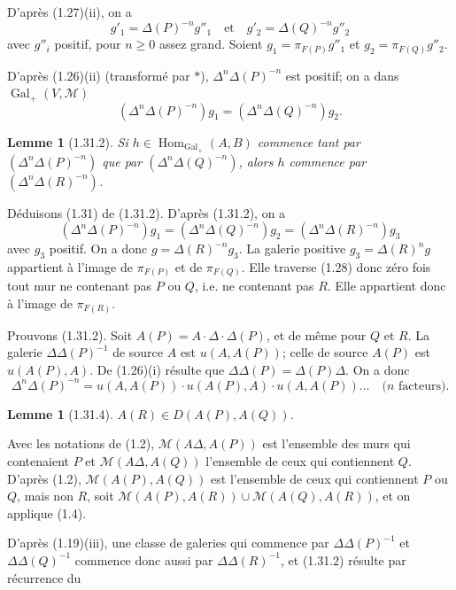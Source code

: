\documentclass[12pt]{article}
\newtheorem{lemme}[theoreme]{Lemme}
\theoremstyle{remark}
\DeclareMathOperator{\Gal}{Gal}
\DeclareMathOperator{\Hom}{Hom}
\begin{document}
D'après (1.27)(ii), on a
\[g'_1 = \Delta(P)^{-n} g''_1 \quad \text{et} \quad g'_2 = \Delta(Q)^{-n} g''_2\]
avec $g''_i$ positif, pour $n \geq 0$ assez grand. Soient $g_1 = \pi_{F(P)} g''_1$ et $g_2 = \pi_{F(Q)} g''_2$.

D'après (1.26)(ii) (transformé par $*$), $\Delta^n \Delta(P)^{-n}$ est positif; on a dans $\Gal_+(V, \mathcal{M})$
\begin{equation}
(\Delta^n \Delta(P)^{-n}) g_1 = (\Delta^n \Delta(Q)^{-n}) g_2.\tag{1.31.1}
\end{equation}

\begin{lemme}[1.31.2]
Si $h \in \Hom_{\Gal_+}(A, B)$ commence tant par $(\Delta^n \Delta(P)^{-n})$ que par $(\Delta^n \Delta(Q)^{-n})$, alors $h$ commence par $(\Delta^n \Delta(R)^{-n})$.
\end{lemme}

Déduisons (1.31) de (1.31.2). D'après (1.31.2), on a
\[(\Delta^n \Delta(P)^{-n}) g_1 = (\Delta^n \Delta(Q)^{-n}) g_2 = (\Delta^n \Delta(R)^{-n}) g_3\]
avec $g_3$ positif. On a donc $g = \Delta(R)^{-n} g_3$. La galerie positive $g_3 = \Delta(R)^n g$ appartient à l'image de $\pi_{F(P)}$ et de $\pi_{F(Q)}$. Elle traverse (1.28) donc zéro fois tout mur ne contenant pas $P$ ou $Q$, i.e. ne contenant pas $R$. Elle appartient donc à l'image de $\pi_{F(R)}$.

Prouvons (1.31.2). Soit $A(P) = A \cdot \Delta \cdot \Delta(P)$, et de même pour $Q$ et $R$. La galerie $\Delta \Delta(P)^{-1}$ de source $A$ est $u(A, A(P))$; celle de source $A(P)$ est $u(A(P), A)$. De (1.26)(i) résulte que $\Delta \Delta(P) = \Delta(P) \Delta$. On a donc
\begin{equation}
\Delta^n \Delta(P)^{-n} = u(A, A(P)) \cdot u(A(P), A) \cdot u(A, A(P)) \ldots \quad \text{($n$ facteurs).}\tag{1.31.3}
\end{equation}

\begin{lemme}[1.31.4]
$A(R) \in D(A(P), A(Q))$.
\end{lemme}

Avec les notations de (1.2), $\mathcal{M}(A \Delta, A(P))$ est l'ensemble des murs qui contenaient $P$ et $\mathcal{M}(A \Delta, A(Q))$ l'ensemble de ceux qui contiennent $Q$. D'après (1.2), $\mathcal{M}(A(P), A(Q))$ est l'ensemble de ceux qui contiennent $P$ ou $Q$, mais non $R$, soit $\mathcal{M}(A(P), A(R)) \cup \mathcal{M}(A(Q), A(R))$, et on applique (1.4).

D'après (1.19)(iii), une classe de galeries qui commence par $\Delta \Delta(P)^{-1}$ et $\Delta \Delta(Q)^{-1}$ commence donc aussi par $\Delta \Delta(R)^{-1}$, et (1.31.2) résulte par récurrence du
\end{document}
